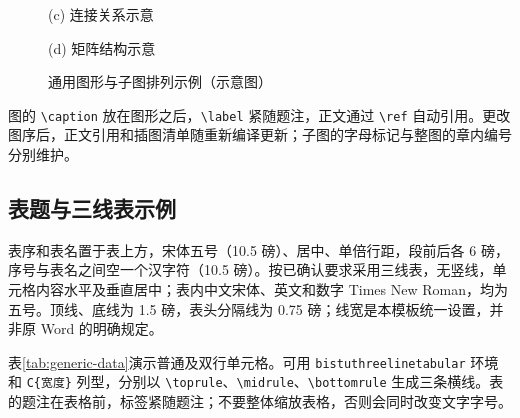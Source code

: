 \begin{figure}[htbp]
\begin{minipage}[t]{0.46\textwidth}
\par
    {\bistutablefont (c) 连接关系示意\par}
  \end{minipage}\hfill
  \begin{minipage}[t]{0.46\textwidth}
    \centering
    \par
    {\bistutablefont (d) 矩阵结构示意\par}
  \end{minipage}
  \caption{通用图形与子图排列示例（示意图）}
  \label{fig:generic-panels}
\end{figure}

图的 \verb|\caption| 放在图形之后，\verb|\label| 紧随题注，正文通过 \verb|\ref| 自动引用。更改图序后，正文引用和插图清单随重新编译更新；子图的字母标记与整图的章内编号分别维护。

\subsection{表题与三线表示例}

表序和表名置于表上方，宋体五号（10.5 磅）、居中、单倍行距，段前后各 6 磅，序号与表名之间空一个汉字符（10.5 磅）。按已确认要求采用三线表，无竖线，单元格内容水平及垂直居中；表内中文宋体、英文和数字 Times New Roman，均为五号。顶线、底线为 1.5 磅，表头分隔线为 0.75 磅；线宽是本模板统一设置，并非原 Word 的明确规定。

表\ref{tab:generic-data}演示普通及双行单元格。可用 \texttt{bistuthreelinetabular} 环境和 \verb|C{宽度}| 列型，分别以 \verb|\toprule|、\verb|\midrule|、\verb|\bottomrule| 生成三条横线。表的题注在表格前，标签紧随题注；不要整体缩放表格，否则会同时改变文字字号。

